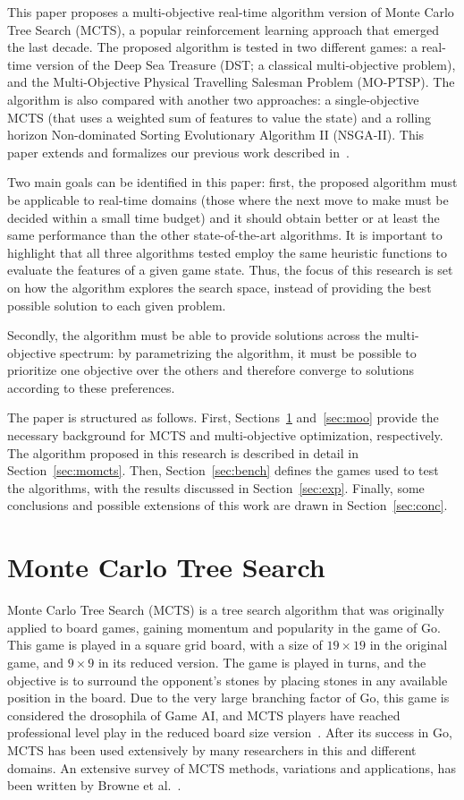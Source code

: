 \documentclass[journal]{IEEEtran}
\begin{document}
This paper proposes a multi-objective real-time algorithm version of Monte Carlo Tree Search (MCTS), a popular reinforcement learning approach that emerged the last decade. The proposed algorithm is tested in two different games: a real-time version of the Deep Sea Treasure (DST; a classical multi-objective problem), and the Multi-Objective Physical Travelling Salesman Problem (MO-PTSP). The algorithm is also compared with another two approaches: a single-objective MCTS (that uses a weighted sum of features to value the state) and a rolling horizon Non-dominated Sorting Evolutionary Algorithm II (NSGA-II). This paper extends and formalizes our previous work described in~\cite{Perez2013a}.

Two main goals can be identified in this paper: first, the proposed algorithm must be applicable to real-time domains (those where the next move to make must be decided within a small time budget) and it should obtain better or at least the same performance than the other state-of-the-art algorithms. It is important to highlight that all three algorithms tested employ the same heuristic functions to evaluate the features of a given game state. Thus, the focus of this research is set on how the algorithm explores the search space, instead of providing the best possible solution to each given problem. 

Secondly, the algorithm must be able to provide solutions across the multi-objective spectrum: by parametrizing the algorithm, it must be possible to prioritize one objective over the others and therefore converge to solutions according to these preferences. 

The paper is structured as follows. First, Sections~\ref{sec:mcts} and~\ref{sec:moo} provide the necessary background for MCTS and multi-objective optimization, respectively. The algorithm proposed in this research is described in detail in Section~\ref{sec:momcts}. Then, Section~\ref{sec:bench} defines the games used to test the algorithms, with the results discussed in Section~\ref{sec:exp}. Finally, some conclusions and possible extensions of this work are drawn in Section~\ref{sec:conc}.


\section{Monte Carlo Tree Search} \label{sec:mcts}

Monte Carlo Tree Search (MCTS) is a tree search algorithm that was originally applied to board games, gaining momentum and popularity in the game of Go. This game is played in a square grid board, with a size of $19 \times 19$ in the original game, and $9 \times 9$ in its reduced version. The game is played in turns, and the objective is to surround the opponent's stones by placing stones in any available position in the board. Due to the very large branching factor of Go, this game is considered the drosophila of Game AI, and MCTS players have reached professional level play in the reduced board size version~\cite{Lee2009}. After its success in Go, MCTS has been used extensively by many researchers in this and different domains. An extensive survey of MCTS methods, variations and applications, has been written by Browne et al.~\cite{Browne2012}. 
\end{document}
